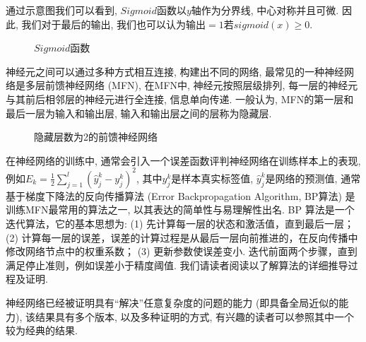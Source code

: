 \documentclass[lang=cn, 11pt,   a4paper]{elegantpaper}
\begin{document}
通过示意图我们可以看到, $Sigmoid$函数以$y$轴作为分界线, 中心对称并且可微. 因此, 我们对于最后的输出, 我们也可以认为输出$=1$若$sigmoid (x) \ge 0$. 
\begin{figure}[H]
\caption{$Sigmoid$函数}
\end{figure}

神经元之间可以通过多种方式相互连接, 构建出不同的网络, 最常见的一种神经网络是多层前馈神经网络 (MFN), 在MFN中, 神经元按照层级排列, 每一层的神经元与其前后相邻层的神经元进行全连接, 信息单向传递. 一般认为, MFN的第一层和最后一层为输入和输出层, 输入和输出层之间的层称为隐藏层. 
\begin{figure}[h]
\label{fig: fullconnection}
\caption{隐藏层数为2的前馈神经网络\cite{raschka15}}
\end{figure}

在神经网络的训练中, 通常会引入一个误差函数评判神经网络在训练样本上的表现, 例如$E_{k}=\frac{1}{2} \sum_{j=1}^{l}\left (\hat{y}_{j}^{k}-y_{j}^{k}\right)^{2}$, 其中$y_{j}^{k}$是样本真实标签值, $\hat{y}_{j}^{k}$是网络的预测值, 通常基于梯度下降法的反向传播算法 (Error Backpropagation Algorithm, BP算法) 是训练MFN最常用的算法之一, 以其表达的简单性与易理解性出名. BP 算法是一个迭代算法，它的基本思想为: (1) 先计算每一层的状态和激活值，直到最后一层；(2) 计算每一层的误差，误差的计算过程是从最后一层向前推进的，在反向传播中修改网络节点中的权重系数； (3) 更新参数使误差变小. 迭代前面两个步骤，直到满足停止准则，例如误差小于精度阈值. 我们请读者阅读\cite{周16, Mitchell97}以了解算法的详细推导过程及证明. 

神经网络已经被证明具有“解决”任意复杂度的问题的能力 (即具备全局近似的能力), 该结果具有多个版本, 以及多种证明的方式, 有兴趣的读者可以参照其中一个较为经典的结果\cite{hornik89}.
\end{document}
